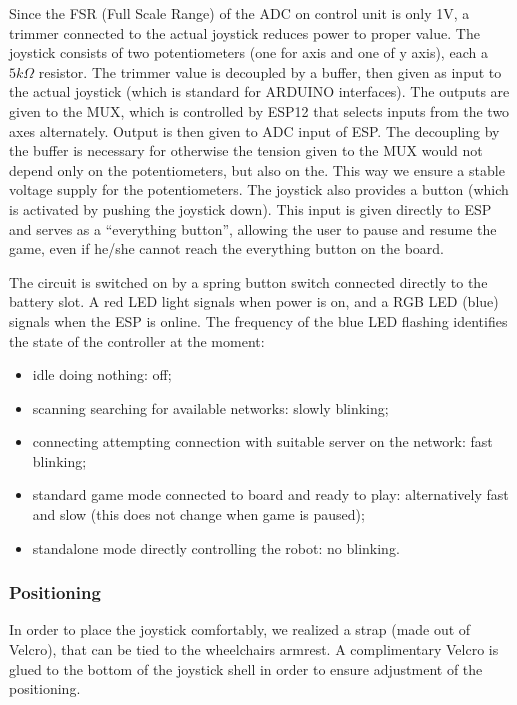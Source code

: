 \documentclass[a4paper,twoside]{book}
\begin{document}
Since the FSR (Full Scale Range) of the ADC on control unit is only 1V, a trimmer connected to the actual joystick reduces power to proper value. The joystick consists of two potentiometers (one for axis and one of y axis), each a $5k\Omega$ resistor.
The trimmer value is decoupled by a buffer, then given as input to the actual joystick (which is standard for ARDUINO interfaces). The outputs are given to the MUX, which is controlled by ESP12 that selects inputs from the two axes alternately. Output is then given to ADC input of ESP. The decoupling by the buffer is necessary for otherwise the tension given to the MUX would not depend only on the potentiometers, but also on the. This way we ensure a stable voltage supply for the potentiometers. 
The joystick also provides a button (which is activated by pushing the joystick down). This input is given directly to ESP and serves as a \textquotedblleft everything button\textquotedblright , allowing the user to pause and resume the game, even if he/she cannot reach the everything button on the board.

\beforelist* The circuit is switched on by a spring button switch connected directly to the battery slot. A red LED light signals when power is on, and a RGB LED (blue) signals when the ESP is online. The frequency of the blue LED flashing identifies the state of the controller at the moment:
\begin{itemize}
\item idle \textemdash doing nothing: off;
\item scanning \textemdash searching for available networks: slowly blinking;
\item connecting \textemdash attempting connection with suitable server on the network: fast blinking;
\item standard game mode \textemdash connected to board and ready to play: alternatively fast and slow (this does not change when game is paused);
\item standalone mode \textemdash directly controlling the robot: no blinking.
\end{itemize}
\afterlist*

\subsubsection{Positioning}

In order to place the joystick comfortably, we realized a strap (made out of Velcro), that can be tied to the wheelchairs armrest. A complimentary Velcro is glued to the bottom of the joystick shell in order to ensure adjustment of the positioning. 
\end{document}
